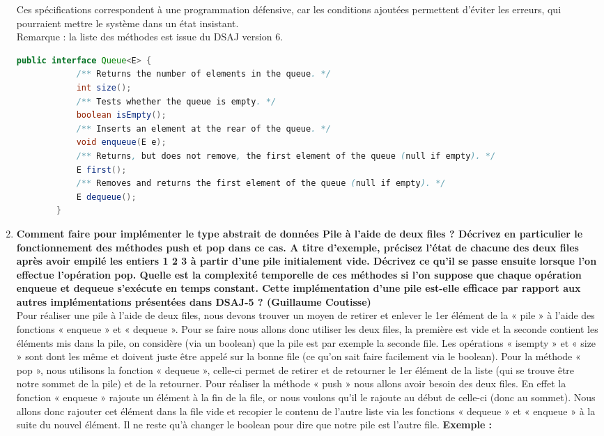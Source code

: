 \documentclass[a4paper]{article}
\begin{document}
\begin{enumerate}
		Ces spécifications correspondent à une programmation défensive, car les conditions ajoutées permettent d’éviter les erreurs, qui pourraient mettre le système dans un état insistant.\\
		Remarque : la liste des méthodes est issue du DSAJ version 6.\\
		
		\begin{lstlisting}[language=Java, caption=Interface Queue DSAJ version 6 page 220 :]
		public interface Queue<E> {
			/** Returns the number of elements in the queue. */
			int size();
			/** Tests whether the queue is empty. */
			boolean isEmpty();
			/** Inserts an element at the rear of the queue. */
			void enqueue(E e);
			/** Returns, but does not remove, the first element of the queue (null if empty). */
			E first();
			/** Removes and returns the first element of the queue (null if empty). */
			E dequeue();
		}
		\end{lstlisting}

		\item\textbf{Comment faire pour implémenter le type abstrait de données Pile à l’aide de deux files ? Décrivez en particulier le fonctionnement des méthodes push et pop dans ce cas. A titre d’exemple, précisez l’état de chacune des deux files après avoir empilé les entiers 1 2 3 à partir d’une pile initialement vide. Décrivez ce qu’il se passe ensuite lorsque l’on effectue l’opération pop. Quelle est la complexité temporelle de ces méthodes si l’on suppose que chaque opération enqueue et dequeue s’exécute en temps constant. Cette implémentation d’une pile est-elle efficace par rapport aux autres implémentations présentées dans DSAJ-5 ? (Guillaume Coutisse)}
\\

Pour réaliser une pile à l’aide de deux files, nous devons trouver un moyen de retirer et enlever le 1er élément de la « pile » à l’aide des fonctions « enqueue » et « dequeue ». Pour se faire nous allons donc utiliser les deux files, la première est vide et la seconde contient les éléments mis dans la pile, on considère (via un boolean) que la pile est par exemple la seconde file. Les opérations « isempty » et « size » sont dont les même et doivent juste être appelé sur la bonne file (ce qu’on sait faire facilement via le boolean). Pour la méthode « pop », nous utilisons la fonction « dequeue », celle-ci permet de retirer et de retourner le 1er élément de la liste (qui se trouve être notre sommet de la pile) et de la retourner. Pour réaliser la méthode « push » nous allons avoir besoin des deux files. En effet la fonction  « enqueue » rajoute un élément à la fin de la file, or nous voulons qu’il le rajoute au début de celle-ci (donc au sommet). Nous allons donc rajouter cet élément dans la file vide et recopier le contenu de l’autre liste via les fonctions « dequeue »  et « enqueue » à la suite du nouvel élément. Il ne reste qu’à changer le boolean pour dire que notre pile est l’autre file.
				\newpage
		\textbf{Exemple :} 
		

\end{enumerate}
\end{document}
